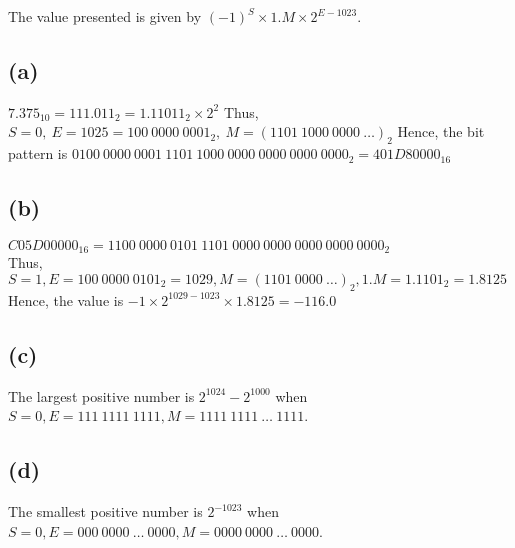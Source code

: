 The value presented is given by $(-1)^{S} \times 1.M \times 2^{E-1023}$.


\subsection*{(a)}
$7.375_{10} = 111.011_{2} = 1.11011_{2} \times 2^{2}$
Thus, $S = 0,\ E = 1025 = 100\ 0000\ 0001_{2},\ M = (1101\ 1000\ 0000\ \dots)_{2}$
Hence, the bit pattern is $0100\ 0000\ 0001\ 1101\ 1000\ 0000\ 0000\ 0000\ 0000_{2} = 401D80000_{16}$

\subsection*{(b)}
$C05D00000_{16} = 1100\ 0000\ 0101\ 1101\ 0000\ 0000\ 0000\ 0000\ 0000_{2}$ \\
Thus, $S = 1, E = 100\ 0000\ 0101_{2} = 1029, M = (1101\ 0000\ \dots)_{2}, 1.M = 1.1101_{2} = 1.8125$ \\
Hence, the value is $-1 \times 2^{1029 - 1023} \times 1.8125 = -116.0$

\subsection*{(c)}
The largest positive number is $2^{1024} - 2^{1000}$ when $S = 0, E = 111\ 1111\ 1111, M = 1111\ 1111\ \dots\ 1111$.

\subsection*{(d)}
The smallest positive number is $2^{-1023}$ when $S = 0, E = 000\ 0000\ \dots\ 0000, M = 0000\ 0000\ \dots\ 0000$.



